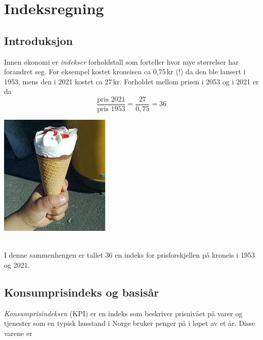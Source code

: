 





\newpage
\section{Indeksregning}
\subsection{Introduksjon}
\parbox{0.6\linewidth}{Innen økonomi er \textit{indekser} forholdstall som forteller hvor mye størrelser har forandret seg. For eksempel kostet kroneisen ca 0,75\,kr (!) da den ble lansert i 1953, mens den i 2021 kostet ca 27\,kr. Forholdet mellom prisen i 2053 og i 2021 er da
	\[ \frac{\text{pris 2021}}{\text{pris 1953}}=\frac{27}{0,75}= 36 \]
}
\parbox[r]{0.3\linewidth}{\includegraphics[scale=2]{kr}}\\[2pt]
I denne sammenhengen  er tallet 36 en indeks for prisforskjellen på kroneis i 1953 og 2021.

\subsection{Konsumprisindeks og basisår}
\textit{Konsumprisindeksen} (KPI) er en indeks som beskriver prisnivået på varer og tjenester som en typisk husstand i Norge bruker penger på i løpet av et år. Disse varene er \vs

